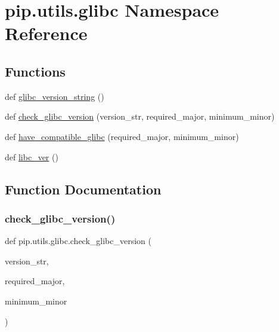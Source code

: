 \hypertarget{namespacepip_1_1utils_1_1glibc}{}\section{pip.\+utils.\+glibc Namespace Reference}
\label{namespacepip_1_1utils_1_1glibc}
\subsection*{Functions}
\begin{DoxyCompactItemize}
\item 
def \hyperlink{namespacepip_1_1utils_1_1glibc_a466176543ef973d4f59d85ea4abb5397}{glibc\+\_\+version\+\_\+string} ()
\item 
def \hyperlink{namespacepip_1_1utils_1_1glibc_a2600f8e546272c0ca55630666203844d}{check\+\_\+glibc\+\_\+version} (version\+\_\+str, required\+\_\+major, minimum\+\_\+minor)
\item 
def \hyperlink{namespacepip_1_1utils_1_1glibc_af7bf99a8e9b49fb400c612a0a862522e}{have\+\_\+compatible\+\_\+glibc} (required\+\_\+major, minimum\+\_\+minor)
\item 
def \hyperlink{namespacepip_1_1utils_1_1glibc_ae753077d5669fbe3dbf5ebf0f0a9ea81}{libc\+\_\+ver} ()
\end{DoxyCompactItemize}


\subsection{Function Documentation}
\mbox{\label{namespacepip_1_1utils_1_1glibc_a2600f8e546272c0ca55630666203844d}} 
\subsubsection{\texorpdfstring{check\+\_\+glibc\+\_\+version()}{check\_glibc\_version()}}
{\footnotesize\ttfamily def pip.\+utils.\+glibc.\+check\+\_\+glibc\+\_\+version (\begin{DoxyParamCaption}\item[{}]{version\+\_\+str,  }\item[{}]{required\+\_\+major,  }\item[{}]{minimum\+\_\+minor }\end{DoxyParamCaption})}

